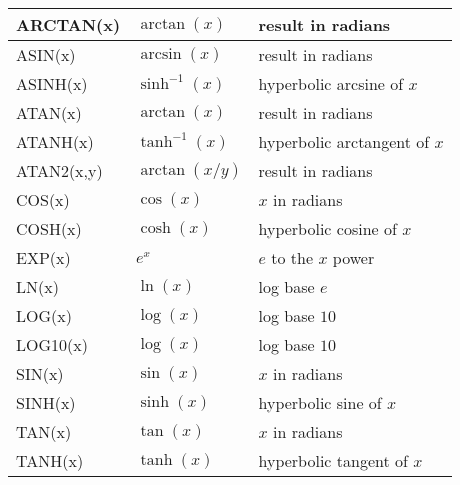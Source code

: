 {\begin{longtable}{>{\raggedright\small}m{1in}>{\raggedright\small}m{2in}>{\raggedright\let\\\tabularnewline\small}m{2in}}
    ARCTAN(x) & $\arctan(x)$ & result in radians \\ \hline

    ASIN(x) & $\arcsin(x)$ & result in radians \\ \hline

    ASINH(x) & $\sinh^{-1}(x)$ & hyperbolic arcsine of $x$ \\ \hline

    ATAN(x) & $\arctan(x)$ & result in radians \\ \hline

    ATANH(x) & $\tanh^{-1}(x)$ & hyperbolic arctangent of $x$ \\ \hline

    ATAN2(x,y) & $\arctan(x/y)$ & result in radians \\ \hline

    COS(x) & $\cos(x)$ & $x$ in radians \\ \hline

    COSH(x) & $\cosh(x)$ & hyperbolic cosine of $x$ \\ \hline

    EXP(x) & $e^{x}$ & $e$ to the $x$ power \\ \hline

    LN(x) & $\ln(x)$ & log base $e$ \\ \hline

    LOG(x) & $\log(x)$ & log base $10$ \\ \hline

    LOG10(x) & $\log(x)$ & log base $10$ \\ \hline

    SIN(x) & $\sin(x)$ & $x$ in radians \\ \hline

    SINH(x) & $\sinh(x)$ & hyperbolic sine of $x$ \\ \hline

    TAN(x) & $\tan(x)$ & $x$ in radians \\ \hline

    TANH(x) & $\tanh(x)$ & hyperbolic tangent of $x$ \\ \hline


\end{longtable}}
